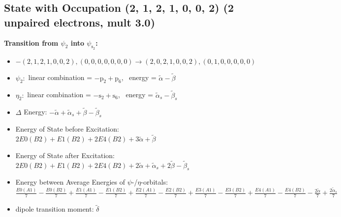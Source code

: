 \documentclass[12pt,a4paper]{article}
\begin{document}
\subsection*{State with Occupation (2, 1, 2, 1, 0, 0, 2) (2 unpaired electrons, mult 3.0)}
        \noindent\textbf{Transition from $\psi_{2}$ into $\psi_{\text{s}_{2}}$:}
        \begin{itemize}
            \item $- (2, 1, 2, 1, 0, 0, 2), (0, 0, 0, 0, 0, 0, 0) \rightarrow (2, 0, 2, 1, 0, 0, 2), (0, 1, 0, 0, 0, 0, 0)$
        
            \item $\psi_{2}:$ linear combination = $- \text{p}_{2} + \text{p}_{6}$, \
            energy = $\tilde{\alpha} - \tilde{\beta}$
            
            \item $\eta_{2}:$ linear combination = $- \text{s}_{2} + \text{s}_{6}$, \
            energy = $\tilde{\alpha}_{s} - \tilde{\beta}_{s}$
            
                \item $\Delta$ Energy: $- \tilde{\alpha} + \tilde{\alpha}_{s} + \tilde{\beta} - \tilde{\beta}_{s}$
                \item Energy of State before Excitation: $2 E0(B2) + E1(B2) + 2 E4(B2) + 3 \tilde{\alpha} + \tilde{\beta}$
                \item Energy of State after Excitation: $2 E0(B2) + E1(B2) + 2 E4(B2) + 2 \tilde{\alpha} + \tilde{\alpha}_{s} + 2 \tilde{\beta} - \tilde{\beta}_{s}$
                \item Energy between Average Energies of $\psi$-/$\eta$-orbitals: $\frac{E0(A1)}{7} - \frac{E0(B2)}{7} + \frac{E1(A1)}{7} - \frac{E1(B2)}{7} + \frac{E2(A1)}{7} - \frac{E2(B2)}{7} + \frac{E3(A1)}{7} - \frac{E3(B2)}{7} + \frac{E4(A1)}{7} - \frac{E4(B2)}{7} - \frac{2 \tilde{\alpha}}{7} + \frac{2 \tilde{\alpha}_{s}}{7}$
            
            \item dipole transition moment: $\tilde{\delta}$
        
        \end{itemize}
        
\end{document}
